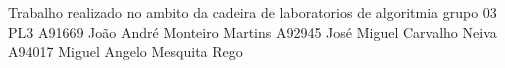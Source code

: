 Trabalho realizado no ambito da cadeira de laboratorios de algoritmia grupo 03 P\+L3 A91669 João André Monteiro Martins A92945 José Miguel Carvalho Neiva A94017 Miguel Angelo Mesquita Rego 